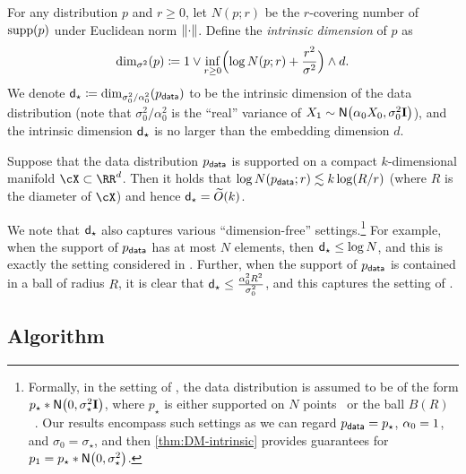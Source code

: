 \begin{definition}\label{def:intrinsic}
For any distribution $p$ and $r\geq 0$, let $N(p;r)$ be the $r$-covering number of $\supp(p)$ under Euclidean norm $\nrm{\cdot}$. Define the \emph{intrinsic dimension} of $p$ as
\begin{align*}
    \dim_{\sigma^2}(p)\deq 1\vee \inf_{r\geq 0} \prn[\Big]{ \log N(p;r)+\frac{r^2}{\sigma^2} }\wedge d.
\end{align*}
We denote $\dstar\deq \dim_{\sigma_0^2/\alpha_0^2}(\pdata)$ to be the intrinsic dimension of the data distribution (note that $\sigma_0^2/\alpha_0^2$ is the ``real'' variance of $X_1\sim \normal{\alpha_0X_0,\sigma_0^2\Id}$), and the intrinsic dimension $\dstar$ is no larger than the embedding dimension $d$. 
\end{definition}


\begin{example}
Suppose that the data distribution $\pdata$ is supported on a compact $k$-dimensional manifold $\cX\subset \RR^d$. Then it holds that $\log N(\pdata;r)\leqsim k\log(R/r)$ (where $R$ is the diameter of $\cX$) and hence $\dstar=\wt{O}(k)$.
\end{example}

We note that $\dstar$ also captures various ``dimension-free'' settings.\footnote{Formally, in the setting of \cite{li2025dimension,gatmiry2026high}, the data distribution is assumed to be of the form $p_\star*\normal{0,\sigma_\star^2 \Id}$, where $p_\star$ is either supported on $N$ points~\citep{li2025dimension} or the ball $B(R)$~\citep{gatmiry2026high}. Our results encompass such settings as we can regard $\pdata=p_\star$, $\alp_0=1$, and $\sigma_0=\sigma_\star$, and then \cref{thm:DM-intrinsic} provides guarantees for $p_1=p_\star*\normal{0,\sigma_\star^2}$.} For example, when the support of $\pdata$ has at most $N$ elements, then $\dstar\leq \log N$, and this is exactly the setting considered in \cite{li2025dimension}. Further, when the support of $\pdata$ is contained in a ball of radius $R$, it is clear that $\dstar\leq \frac{\alpha_0^2R^2}{\sigma_0^2}$, and this captures the setting of \citet{gatmiry2026high}.

\subsection{Algorithm}

